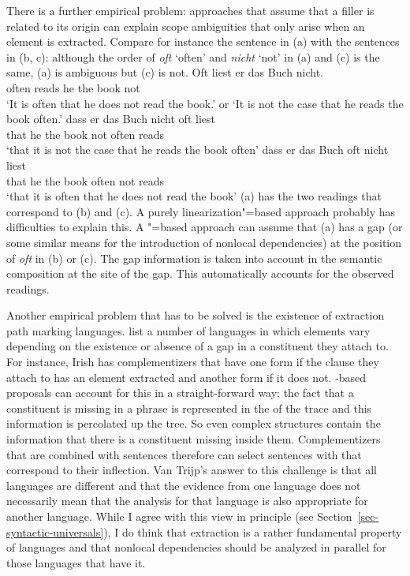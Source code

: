 There is a further empirical problem: approaches that assume that a filler is related to its origin
can explain scope ambiguities that only arise when an element is extracted. Compare for instance the
sentence in (a) with the sentences in (b, c): although the order of \emph{oft} `often' and
\emph{nicht} `not' in (a) and (c) is the same, (a) is ambiguous but (c) is
not.
\eal
\ex 
\gll Oft liest er das Buch nicht.\\
     often reads he the book not\\
\glt `It is often that he does not read the book.' or `It is not the case that he reads the book
often.'
\ex
\gll dass er das Buch nicht oft liest\\
     that he the book not often reads\\
\glt `that it is not the case that he reads the book often'
\ex
\gll dass er das Buch oft nicht liest\\
     that he the book often not reads\\
\glt `that it is often that he does not read the book'
\zl
(a) has the two readings that correspond to (b) and (c). A purely
linearization"=based approach probably has difficulties to explain this. A \slasch"=based approach
can assume that (a) has a gap (or some similar means for the introduction of nonlocal
dependencies) at the position of \emph{oft} in (b) or (c). The gap information is
taken into account in the semantic composition at the site of the gap. This automatically accounts
for the observed readings.

Another empirical problem that has to be solved is the existence of extraction path
marking
languages. \citet*{BMS2001a} list a number of languages in which elements vary depending on the
existence or absence of a gap in a constituent they attach to. For instance, Irish has
complementizers that have one form if the clause they attach to has an element extracted and another
form if it does not. \slasch-based proposals can account for this in a straight-forward way: the
fact that a constituent is missing in a phrase is represented in the \slashv of the trace and this
information is percolated up the tree. So even complex structures contain the information that there
is a constituent missing inside them. Complementizers that are combined with sentences therefore can
select sentences with \slashvs that correspond to their inflection.
Van Trijp's answer to this challenge is that all languages are different
\citep[]{vanTrijp2014a} and that the evidence from one language does not necessarily mean that the analysis for that language is
also appropriate for another language. While I agree with this view in principle (see
Section~\ref{sec-syntactic-universals}), I do think that extraction is a rather fundamental property
of languages and that nonlocal dependencies should be analyzed in parallel for those languages that
have it.

